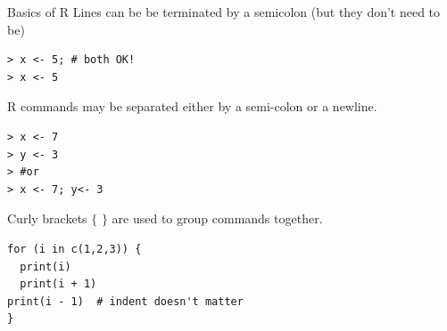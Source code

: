 \documentclass[xcolor=svgnames, 10pt]{beamer}
\begin{document}


\begin{frame}[fragile]{Basics of R}
\vfill
Lines can be be terminated by a semicolon (but they don't need to be) 
\begin{Verbatim}
> x <- 5; # both OK!
> x <- 5
\end{Verbatim}

\vfill
R commands may be separated either by a semi-colon or a newline.
\begin{Verbatim}[xleftmargin=0.3in]
> x <- 7
> y <- 3
> #or
> x <- 7; y<- 3
\end{Verbatim}
\vfill
Curly brackets $\{$ $\}$ are used to group commands together.
\begin{Verbatim}[xleftmargin=0.5in]
for (i in c(1,2,3)) {
  print(i)
  print(i + 1)
print(i - 1)  # indent doesn't matter
}
\end{Verbatim}
\vfill
\end{frame}
\end{document}
